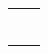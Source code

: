 \documentclass[10pt]{article}
\begin{document}
\begin{table}[h]
  \begin{tabular}{L{11.5cm} L{6.5cm}}
     \\
    \hspace{1cm} &  \\
    \hspace{1cm}\sgray{\officeaddr} & \sgray{\homeaddr}\\
    \hspace{1cm}\sgray{\officepostalcode} & \sgray{\homepostalcode}\\
    \hspace{1cm}\sgray{\emailtag~\officeemail} & \sgray{\emailtag~\homeemail}\\
    \hspace{1cm}\sgray{\teltag~\officetel} & \sgray{\teltag~\hometel}\\
  \end{tabular}
\end{table}

\vspace{1cm}










\end{document}
